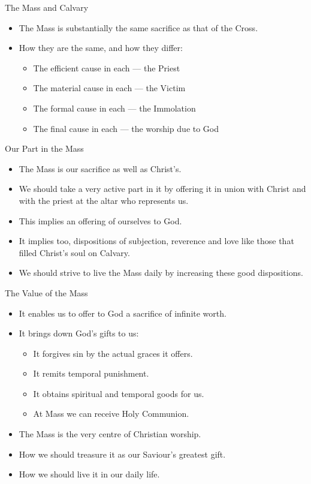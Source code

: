 \documentclass{beamer}
\begin{document}
\begin{frame}{The Mass and Calvary}
\begin{itemize}
\item    The Mass is substantially the same sacrifice as that of the Cross.
\item    How they are the same, and how they differ:
\begin{itemize}
      \item The efficient cause in each --- the Priest
     \item The material cause in each --- the Victim
    \item The formal cause in each --- the Immolation
     \item The final cause in each --- the worship due to God
\end{itemize}
\end{itemize}
\end{frame}

\begin{frame}{Our Part in the Mass}
\begin{itemize}
\item    The Mass is our sacrifice as well as Christ's.
\item    We should take a very active part in it by offering  it  in  union
    with Christ and with the priest at the altar who represents us.
\item    This implies an offering of ourselves to God.
\item    It implies too, dispositions of  subjection,  reverence  and  love
    like those that filled Christ's soul on Calvary.
\item    We should strive to live the Mass daily by increasing  these  good
    dispositions.
\end{itemize}
\end{frame}

\begin{frame}{The Value of the Mass}
\begin{itemize}
\item It enables us to offer to God a sacrifice of infinite worth.
\item It brings down God's gifts to us:
\begin{itemize}
      \item It forgives sin by the actual graces it offers.
     \item It remits temporal punishment.
    \item It obtains spiritual and temporal goods for us.
     \item At Mass we can receive Holy Communion.
\end{itemize}
\item The Mass is the very centre of Christian worship.
\item How we should treasure it as our Saviour's greatest gift.
\item How we should live it in our daily life.
\end{itemize}
\end{frame}
\end{document}

